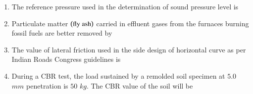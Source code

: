\documentclass[journal,12pt,onecolumn]{IEEEtran}
\theoremstyle{remark}
\begin{document}
\begin{enumerate}
\item The reference pressure used in the determination of sound pressure level is

\hfill{}
\begin{enumerate}
\end{enumerate}

\item Particulate matter $\left(\text{fly ash}\right)$ carried in effluent gases from the furnaces burning fossil fuels are better removed by

\hfill{}
\begin{enumerate}
\end{enumerate}

\item The value of lateral friction used in the side design of horizontal curve as per Indian Roads Congress guidelines is

\hfill{}
\begin{enumerate}
\end{enumerate}

\item During a CBR test, the load sustained by a remolded soil specimen at $5.0$ $mm$ penetration is $50$ $kg$. The CBR value of the soil will be

\hfill{}
\begin{enumerate}
\end{enumerate}


\end{enumerate}
\end{document}
